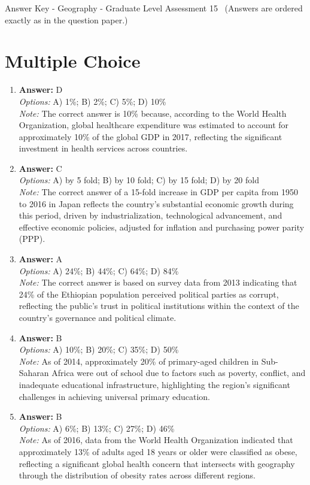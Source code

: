 \documentclass[12pt]{article}
\begin{document}
\begin{center}
Answer Key - Geography - Graduate Level Assessment 15 \
\small (Answers are ordered exactly as in the question paper.)
\end{center}

\section*{Multiple Choice}
\begin{enumerate}[label=\arabic*.]
\item \textbf{Answer:} D
\\ \textit{Options:} A) 1\%; B) 2\%; C) 5\%; D) 10\%
\\ \textit{Note:} The correct answer is 10\% because, according to the World Health Organization, global healthcare expenditure was estimated to account for approximately 10\% of the global GDP in 2017, reflecting the significant investment in health services across countries.
\item \textbf{Answer:} C
\\ \textit{Options:} A) by 5 fold; B) by 10 fold; C) by 15 fold; D) by 20 fold
\\ \textit{Note:} The correct answer of a 15-fold increase in GDP per capita from 1950 to 2016 in Japan reflects the country's substantial economic growth during this period, driven by industrialization, technological advancement, and effective economic policies, adjusted for inflation and purchasing power parity (PPP).
\item \textbf{Answer:} A
\\ \textit{Options:} A) 24\%; B) 44\%; C) 64\%; D) 84\%
\\ \textit{Note:} The correct answer is based on survey data from 2013 indicating that 24\% of the Ethiopian population perceived political parties as corrupt, reflecting the public's trust in political institutions within the context of the country's governance and political climate.
\item \textbf{Answer:} B
\\ \textit{Options:} A) 10\%; B) 20\%; C) 35\%; D) 50\%
\\ \textit{Note:} As of 2014, approximately 20\% of primary-aged children in Sub-Saharan Africa were out of school due to factors such as poverty, conflict, and inadequate educational infrastructure, highlighting the region's significant challenges in achieving universal primary education.
\item \textbf{Answer:} B
\\ \textit{Options:} A) 6\%; B) 13\%; C) 27\%; D) 46\%
\\ \textit{Note:} As of 2016, data from the World Health Organization indicated that approximately 13\% of adults aged 18 years or older were classified as obese, reflecting a significant global health concern that intersects with geography through the distribution of obesity rates across different regions.
\end{enumerate}
\end{document}
